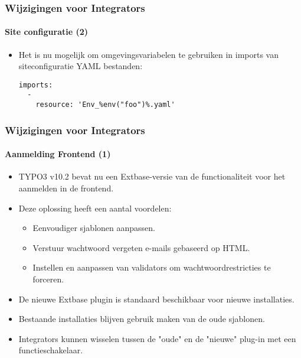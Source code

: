 \begin{frame}[fragile]
	\frametitle{Wijzigingen voor Integrators}
	\framesubtitle{Site configuratie (2)}

	\lstset{basicstyle=\tiny\ttfamily}

	\begin{itemize}

		\item Het is nu mogelijk om omgevingsvariabelen te gebruiken in imports van siteconfiguratie YAML bestanden:
\begin{lstlisting}
imports:
  -
    resource: 'Env_%env("foo")%.yaml'
\end{lstlisting}

	\end{itemize}

\end{frame}


\begin{frame}[fragile]
	\frametitle{Wijzigingen voor Integrators}
	\framesubtitle{Aanmelding Frontend (1)}

	\begin{itemize}

		\item TYPO3 v10.2 bevat nu een Extbase-versie van de functionaliteit voor het aanmelden in de frontend.
		\item Deze oplossing heeft een aantal voordelen:

			\begin{itemize}
				\item Eenvoudiger sjablonen aanpassen.
				\item Verstuur wachtwoord vergeten e-mails gebaseerd op HTML.
				\item Instellen en aanpassen van validators om wachtwoordrestricties te forceren.
			\end{itemize}

		\item De nieuwe Extbase plugin is standaard beschikbaar voor nieuwe installaties.
		\item Bestaande installaties blijven gebruik maken van de oude sjablonen.
		\item Integrators kunnen wisselen tussen de "oude" en de "nieuwe" plug-in met een functieschakelaar.

	\end{itemize}

\end{frame}

